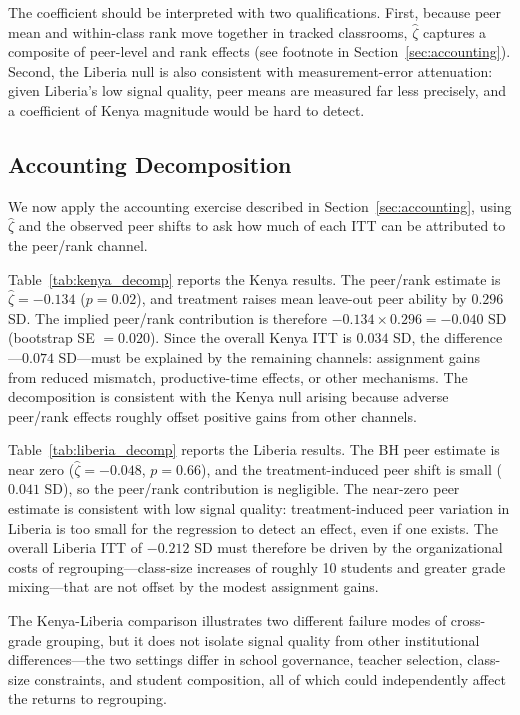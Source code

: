 \documentclass[11pt]{article}
\begin{document}
The coefficient should be interpreted with two qualifications. First, because peer mean and within-class rank move together in tracked classrooms, $\hat{\zeta}$ captures a composite of peer-level and rank effects (see footnote in Section~\ref{sec:accounting}). Second, the Liberia null is also consistent with measurement-error attenuation: given Liberia's low signal quality, peer means are measured far less precisely, and a coefficient of Kenya magnitude would be hard to detect.

\subsection{Accounting Decomposition}

We now apply the accounting exercise described in Section~\ref{sec:accounting}, using $\hat{\zeta}$ and the observed peer shifts to ask how much of each ITT can be attributed to the peer/rank channel.

Table~\ref{tab:kenya_decomp} reports the Kenya results. The peer/rank estimate is $\hat{\zeta} = -0.134$ ($p = 0.02$), and treatment raises mean leave-out peer ability by $0.296$ SD. The implied peer/rank contribution is therefore $-0.134 \times 0.296 = -0.040$ SD (bootstrap SE $= 0.020$). Since the overall Kenya ITT is $0.034$ SD, the difference---$0.074$ SD---must be explained by the remaining channels: assignment gains from reduced mismatch, productive-time effects, or other mechanisms. The decomposition is consistent with the Kenya null arising because adverse peer/rank effects roughly offset positive gains from other channels.

Table~\ref{tab:liberia_decomp} reports the Liberia results. The BH peer estimate is near zero ($\hat{\zeta} = -0.048$, $p = 0.66$), and the treatment-induced peer shift is small ($0.041$ SD), so the peer/rank contribution is negligible. The near-zero peer estimate is consistent with low signal quality: treatment-induced peer variation in Liberia is too small for the regression to detect an effect, even if one exists. The overall Liberia ITT of $-0.212$ SD must therefore be driven by the organizational costs of regrouping---class-size increases of roughly 10 students and greater grade mixing---that are not offset by the modest assignment gains.

The Kenya-Liberia comparison illustrates two different failure modes of cross-grade grouping, but it does not isolate signal quality from other institutional differences---the two settings differ in school governance, teacher selection, class-size constraints, and student composition, all of which could independently affect the returns to regrouping.
\end{document}
